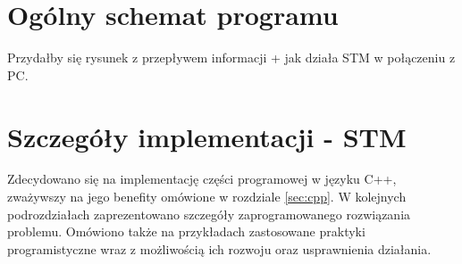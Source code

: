 \section{Ogólny schemat programu} \label{sec:scheme}
Przydałby się rysunek z przepływem informacji + jak działa STM w połączeniu z PC.

\section{Szczegóły implementacji - STM} \label{sec:details-stm}
Zdecydowano się na implementację części programowej w języku C++, zważywszy na jego benefity
omówione w rozdziale \ref{sec:cpp}. W kolejnych podrozdziałach zaprezentowano szczegóły
zaprogramowanego rozwiązania problemu. Omówiono także na przykładach zastosowane praktyki
programistyczne wraz z możliwością ich rozwoju oraz usprawnienia działania. 

